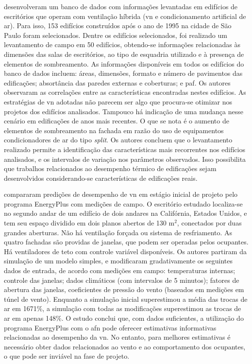  desenvolveram um banco de dados com informações levantadas em edifícios de escritórios que operam com ventilação híbrida (\acrshort{vn} e condicionamento artificial de ar). Para isso, 153 edifícios construídos após o ano de 1995 na cidade de São Paulo foram selecionados. Dentre os edifícios selecionados, foi realizado um levantamento de campo em 50 edifícios, obtendo-se informações relacionadas às dimensões das salas de escritórios, ao tipo de esquadria utilizado e à presença de elementos de sombreamento. As informações disponíveis em todos os edifícios do banco de dados incluem: áreas, dimensões, formato e número de pavimentos das edificações; absortância das paredes externas e coberturas; e \acrfull{paf}. Os autores observaram as correlações entre as características encontradas nestes edifícios. As estratégias de \acrshort{vn} adotadas não parecem ser algo que procura-se otimizar nos projetos dos edifícios analisados. Tampouco há indicação de uma mudança nesse cenário em edificações de anos mais recentes. O que se nota é o aumento de elementos de sombreamento na fachada em razão do uso de equipamentos condicionadores de ar do tipo \textit{split}. Os autores concluem que o levantamento realizado permite a identificação das características mais recorrentes nos edifícios analisados, e os intervalos de variação nos parâmetros observados.
Isso possibilita que trabalhos relacionados ao desempenho térmico de edificações sejam desenvolvidos considerando-se características de edificações reais.

 compararam predições de desempenho de \acrshort{vn} em estágio inicial de projeto pelo programa EnergyPlus com medições de campo. O escritório estudado localiza-se no segundo andar de um edifício de dois andares na Califórnia, Estados Unidos, e tem seu espaço dividido em dois planos abertos de 130 m$^2$, conectados por duas grandes aberturas. Não há ventilação forçada ou sistema de resfriamento. As quatro fachadas são providas de janelas, que podem ser operadas pelos ocupantes. Há ventiladores de teto com controle variável disponíveis. Os autores partiram da simulação de um modelo simples, e modificaram gradativamente os seguintes dados de entrada, de acordo com medições em campo: temperaturas internas; controle das janelas; dados climáticos (com intervalos de 5 minutos); fatores de abertura das janelas, coeficientes de pressão do vento (baseados em medições em túnel de vento). Enquanto a simulação inicial superestimou a média das trocas de ar em 1671\%, a simulação com todas as modificações superestimou as trocas de ar em apenas 148\%. O estudo conclui que, com dados suficientes, a utilização do programa EnergyPlus com o \acrshort{afn} pode oferecer  estimativas informativas relacionadas ao desempenho da \acrshort{vn}. No entanto, para melhores estimativas é necessário obter dados relacionados ao vento e ao comportamento dos ocupantes, o que pode ser inviável na fase de projeto.

